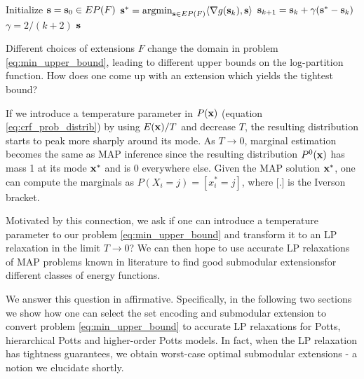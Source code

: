 \begin{algorithm}
\label{algo:fw_inference}
\begin{algorithmic}[1]
    \STATE Initialize ${\bf s} = {\bf s}_0 \in EP(F)$ \label{line:initial}
\STATE ${\bf s^*} = \operatorname*{argmin}_{{\bf s} \in EP(F)} \langle \nabla g({\bf s}_k), {\bf s} \rangle$ \label{line:cond_grad}
\ENDIF
\STATE ${\bf s}_{k + 1} = {\bf s}_k + \gamma({\bf s^*} - {\bf s}_k)$  $\gamma = 2/(k + 2)$ \label{line:step_size}
\ENDFOR   
\RETURN $\bf s$
\end{algorithmic}
\end{algorithm}


Different choices of extensions $F$ change the domain in problem \eqref{eq:min_upper_bound}, leading to different upper bounds on the log-partition function. How does one come up with an extension which yields the tightest bound? 

If we introduce a temperature parameter in $P({\bf x})$ (equation \eqref{eq:crf_prob_distrib}) by using $E({\bf x})/T$ and decrease $T$, the resulting distribution starts to peak more sharply around its mode. As $T \to 0$, marginal estimation becomes the same as MAP inference since the resulting distribution $P^0({\bf x})$ has mass 1 at its mode ${\bf x}^*$ and is 0 everywhere else. Given the MAP solution ${\bf x}^*$, one can compute the marginals as $P(X_i = j) = [x_i^* = j]$, where [.] is the Iverson bracket.

  Motivated by this connection, we ask if one can introduce a temperature parameter to our problem \eqref{eq:min_upper_bound} and transform it to an LP relaxation in the limit $T \to 0$? We can then hope to use accurate LP relaxations of MAP problems known in literature to find good submodular extensionsfor different classes of energy functions. 

We answer this question in affirmative. Specifically, in the following two sections we show how one can select the set encoding and submodular extension to convert problem \eqref{eq:min_upper_bound} to accurate LP relaxations for Potts, hierarchical Potts and higher-order Potts models. In fact, when the LP relaxation has tightness guarantees, we obtain worst-case optimal submodular extensions - a notion we elucidate shortly. 

